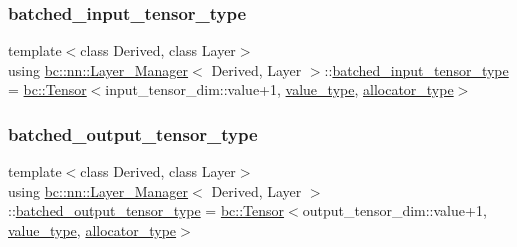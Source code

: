 \subsubsection{\texorpdfstring{batched\+\_\+input\+\_\+tensor\+\_\+type}{batched\_input\_tensor\_type}}
{\footnotesize\ttfamily template$<$class Derived, class Layer$>$ \\
using \hyperlink{structbc_1_1nn_1_1Layer__Manager}{bc\+::nn\+::\+Layer\+\_\+\+Manager}$<$ Derived, Layer $>$\+::\hyperlink{structbc_1_1nn_1_1Layer__Manager_a6e6cd6d324cc79ca740eea2f2438eccb}{batched\+\_\+input\+\_\+tensor\+\_\+type} =  \hyperlink{namespacebc_a659391e47ab612be3ba6c18cf9c89159}{bc\+::\+Tensor}$<$input\+\_\+tensor\+\_\+dim\+::value+1, \hyperlink{structbc_1_1nn_1_1Layer__Manager_af6edd9edf47c73bfc1b200b3cbf2155f}{value\+\_\+type}, \hyperlink{structbc_1_1nn_1_1Layer__Manager_a6618b1c4afdad0eafd781b319f27f230}{allocator\+\_\+type}$>$}

\mbox{\label{structbc_1_1nn_1_1Layer__Manager_af930e926669a5c4130511dcddc289539}} 
\subsubsection{\texorpdfstring{batched\+\_\+output\+\_\+tensor\+\_\+type}{batched\_output\_tensor\_type}}
{\footnotesize\ttfamily template$<$class Derived, class Layer$>$ \\
using \hyperlink{structbc_1_1nn_1_1Layer__Manager}{bc\+::nn\+::\+Layer\+\_\+\+Manager}$<$ Derived, Layer $>$\+::\hyperlink{structbc_1_1nn_1_1Layer__Manager_af930e926669a5c4130511dcddc289539}{batched\+\_\+output\+\_\+tensor\+\_\+type} =  \hyperlink{namespacebc_a659391e47ab612be3ba6c18cf9c89159}{bc\+::\+Tensor}$<$output\+\_\+tensor\+\_\+dim\+::value+1, \hyperlink{structbc_1_1nn_1_1Layer__Manager_af6edd9edf47c73bfc1b200b3cbf2155f}{value\+\_\+type}, \hyperlink{structbc_1_1nn_1_1Layer__Manager_a6618b1c4afdad0eafd781b319f27f230}{allocator\+\_\+type}$>$}

\mbox{\label{structbc_1_1nn_1_1Layer__Manager_a2f124b1c1df68e184adf91d16cf0a5c3}} 
